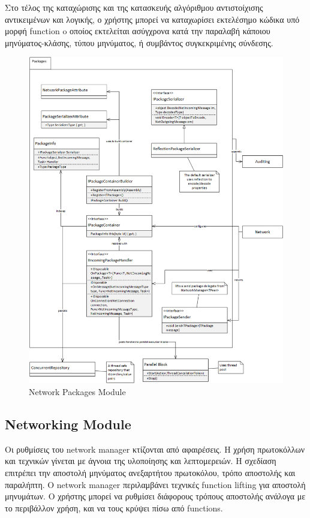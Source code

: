 			Στο τέλος της καταχώρισης και της κατασκευής αλγόριθμου αντιστοίχισης αντικειμένων και λογικής, ο χρήστης μπορεί να καταχωρίσει εκτελέσημο κώδικα υπό μορφή function o οποίος εκτελείται ασύγχρονα κατά την παραλαβή κάποιου μηνύματος-κλάσης, τύπου μηνύματος, ή συμβάντος συγκεκριμένης σύνδεσης.
			
			\begin{figure}
				\centering
				\includegraphics[width=165mm]{Images/network_architecture_packages}
				\caption{Network Packages Module}
				\label{network_packages}
			\end{figure}	
					
			\subsection{Networking Module}	 					
			
			Οι ρυθμίσεις του network manager κτίζονται από αφαιρέσεις. Η χρήση πρωτοκόλλων και τεχνικών γίνεται με άγνοια της υλοποίησης και λεπτομερειών.
			Η σχεδίαση επιτρέπει την αποστολή μηνύματος ανεξαρτήτου πρωτοκόλου, τρόπο αποστολής και παραλήπτη. Ο network manager περιλαμβάνει τεχνικές function lifting για αποστολή μηνυμάτων. Ο χρήστης μπορεί να ρυθμίσει διάφορους τρόπους αποστολής ανάλογα με το περιβάλλον χρήση, και να τους κρύψει πίσω από functions. 
						
